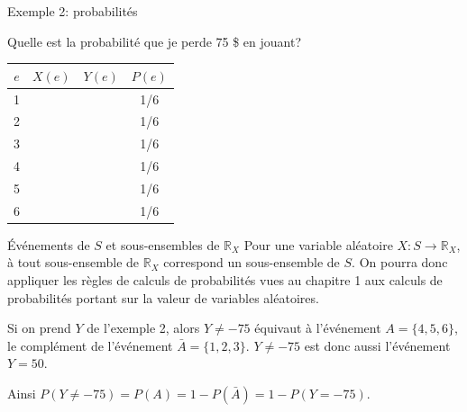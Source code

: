 \documentclass[handout]{BeamerTemplate}
\begin{document}
\begin{frame}[t]{Exemple 2: probabilités}

Quelle est la probabilité que je perde 75 \$ en jouant?\\


{\large
 \begin{tabular}{c|c|c|c}\hline
 $e$ & $X(e)$ & $Y(e)$ & $P(e)$ \\ \hline
  1 & & & 1/6 \\
  2 & &  & 1/6  \\
  3 & &  & 1/6  \\
  4 & &  & 1/6  \\
  5 & &  & 1/6  \\
  6 & &  & 1/6  \\ \hline
 \end{tabular}
}


\end{frame}

\begin{frame}[t]{Événements de $S$ et sous-ensembles de $\mathbb{R}_X$}
Pour une variable aléatoire $X: S\to \mathbb{R}_X$, à tout sous-ensemble de $\mathbb{R}_X$ correspond un sous-ensemble de $S$.
On pourra donc appliquer les règles de calculs de probabilités
vues au chapitre 1 aux calculs de probabilités portant
sur la valeur de variables aléatoires.

\bigskip

{
Si on prend $Y$ de l'exemple 2, alors $Y\neq-75$ équivaut à l'événement
$A=\{4,5,6\}$, le complément de l'événement $\bar{A}=\{1,2,3\}$. $Y\neq-75$
est donc aussi l'événement $Y=50$. 

Ainsi $P(Y\neq -75)=P(A)=1-P(\bar{A})=1-P(Y=-75)$.
}
\end{frame}
\end{document}
